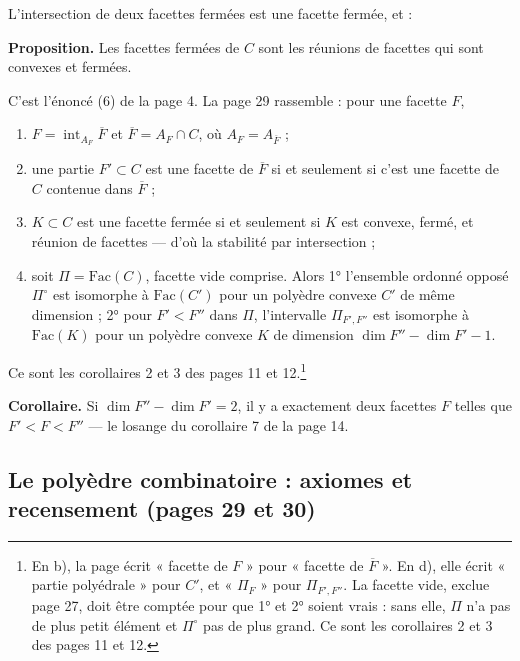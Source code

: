 \documentclass[11pt,a4paper]{article}
\begin{document}
L'intersection de deux facettes fermées est une facette fermée, et :

\textbf{Proposition.} Les facettes fermées de $C$ sont les réunions de facettes
qui sont convexes et fermées.

C'est l'énoncé (6) de la page 4. La page 29 rassemble : pour une facette $F$,
\begin{enumerate}
\item[a)] $F = \operatorname{int}_{A_{F}} \overline{F}$ et $\overline{F} = A_{F}
\cap C$, où $A_{F} = A_{\overline{F}}$ ;
\item[b)] une partie $F' \subset C$ est une facette de $\overline{F}$ si et
seulement si c'est une facette de $C$ contenue dans $\overline{F}$ ;
\item[c)] $K \subset C$ est une facette fermée si et seulement si $K$ est
convexe, fermé, et réunion de facettes --- d'où la stabilité par intersection ;
\item[d)] soit $\Pi = \mathrm{Fac}(C)$, facette vide comprise. Alors 1° l'ensemble
ordonné opposé $\Pi^{\circ}$ est isomorphe à $\mathrm{Fac}(C')$ pour un polyèdre
convexe $C'$ de même dimension ; 2° pour $F' < F''$ dans $\Pi$, l'intervalle
$\Pi_{F',F''}$ est isomorphe à $\mathrm{Fac}(K)$ pour un polyèdre convexe $K$ de
dimension $\dim F'' - \dim F' - 1$.
\end{enumerate}
Ce sont les corollaires 2 et 3 des pages 11 et 12.\footnote{En b), la page écrit « facette de $F$ » pour « facette de
$\overline{F}$ ». En d), elle écrit « partie polyédrale » pour $C'$, et
« $\Pi_{F}$ » pour $\Pi_{F',F''}$. La facette vide, exclue page 27, doit être
comptée pour que 1° et 2° soient vrais : sans elle, $\Pi$ n'a pas de plus petit
élément et $\Pi^{\circ}$ pas de plus grand. Ce sont les corollaires 2 et 3 des
pages 11 et 12.}

\textbf{Corollaire.} Si $\dim F'' - \dim F' = 2$, il y a exactement deux
facettes $F$ telles que $F' < F < F''$ --- le losange du corollaire 7 de la
page 14.

\subsection*{Le polyèdre combinatoire : axiomes et recensement (pages 29 et 30)}
\end{document}

